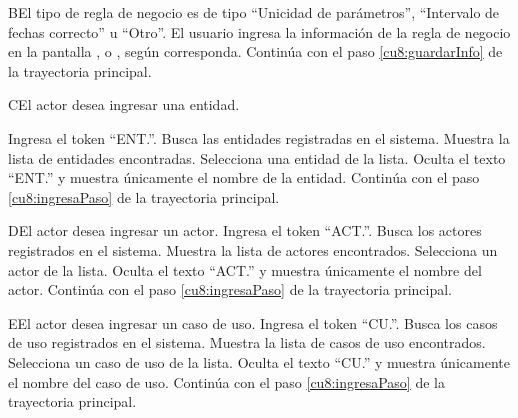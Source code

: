  \begin{UCtrayectoriaA}{B}{El tipo de regla de negocio es de tipo ``Unicidad de parámetros'', ``Intervalo de fechas correcto'' u ``Otro''.}
	\UCpaso[\UCactor] El usuario ingresa la información de la regla de negocio en la pantalla ,
	 o , según corresponda.
	\UCpaso[] Continúa con el paso \ref{cu8:guardarInfo} de la trayectoria principal.
 \end{UCtrayectoriaA}

 \begin{UCtrayectoriaA}{C}{El actor desea ingresar una entidad.}
 	
 	 \UCpaso[\UCactor] Ingresa el token ``ENT.''.
 	\UCpaso[\UCsist] Busca las entidades registradas en el sistema. 
 	\UCpaso[\UCsist] Muestra la lista de entidades encontradas.
 	\UCpaso[\UCactor] Selecciona una entidad de la lista.
  	\UCpaso[\UCsist] Oculta el texto ``ENT.'' y muestra únicamente el nombre de la entidad.
    \UCpaso[] Continúa con el paso \ref{cu8:ingresaPaso} de la trayectoria principal.
 \end{UCtrayectoriaA}
 
 \begin{UCtrayectoriaA}{D}{El actor desea ingresar un actor.}
 	\UCpaso[\UCactor] Ingresa el token ``ACT.''.
 	\UCpaso[\UCsist] Busca los actores registrados en el sistema. 
 	\UCpaso[\UCsist] Muestra la lista de actores encontrados.
 	\UCpaso[\UCactor] Selecciona un actor de la lista.
  	\UCpaso[\UCsist] Oculta el texto ``ACT.'' y muestra únicamente el nombre del actor.
    \UCpaso[] Continúa con el paso \ref{cu8:ingresaPaso} de la trayectoria principal.
 \end{UCtrayectoriaA}

 \begin{UCtrayectoriaA}{E}{El actor desea ingresar un caso de uso.}
  	\UCpaso[\UCactor] Ingresa el token ``CU.''.	
 	\UCpaso[\UCsist] Busca los casos de uso registrados en el sistema. 
 	\UCpaso[\UCsist] Muestra la lista de casos de uso encontrados.
 	\UCpaso[\UCactor] Selecciona un caso de uso de la lista.
  	\UCpaso[\UCsist] Oculta el texto ``CU.'' y muestra únicamente el nombre del caso de uso.
    \UCpaso[] Continúa con el paso \ref{cu8:ingresaPaso} de la trayectoria principal.
 \end{UCtrayectoriaA}

